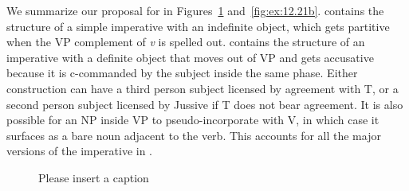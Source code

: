 \documentclass[output=paper]{langsci/langscibook}
\begin{document}
We summarize our proposal for   in
Figures~\ref{fig:ex:12.21a} and~\ref{fig:ex:12.21b}.  contains the structure of a simple
imperative with an indefinite object, which gets partitive when the VP
complement of \emph{v}\textsubscript{\Imp} is spelled
out.  contains the structure of an imperative with a definite
object that moves out of VP and gets accusative because it is c-commanded by
the subject inside the same phase.  Either construction can have a
third person subject licensed by agreement with T, or a second person subject
licensed by Jussive if T does not bear agreement.  It is also possible for an NP
inside VP to pseudo-incorporate with V, in which case it surfaces as a bare
noun adjacent to the verb.  This accounts for all the major versions of the
imperative in .

\begin{figure}
    \caption{\color{red}Please insert a caption\label{fig:ex:12.21a}}
\end{figure}
\end{document}
